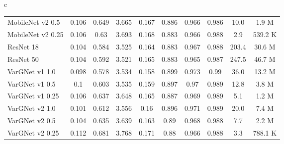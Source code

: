 \documentclass{article}
\begin{document}
\begin{table}
{\begin{tabular}{c}
\begin{tabular}{lccccccccc}
      MobileNet v2 0.5 & 0.106 & 0.649 & 3.665 & 0.167 & 0.886 & 0.966 & 0.986 & 10.0 & 1.9 M \\
      MobileNet v2 0.25 & 0.106 & 0.63 & 3.693 & 0.168 & 0.883 & 0.966 & 0.988 & 2.9 & 539.2 K \\
ResNet 18 & 0.104 & 0.584 & 3.525 & 0.164 & 0.883 & 0.967 & 0.988 & 203.4    & 30.6 M \\
      ResNet 50 & 0.104 & 0.592 & 3.521 & 0.165 & 0.883 & 0.965 & 0.987 & 247.5    & 46.7 M \\ \midrule
      VarGNet v1 1.0 &  0.098 & 0.578 & 3.534 & 0.158 & 0.899 & 0.973 & 0.99 &  36.0   &13.2 M\\
      VarGNet v1 0.5 &  0.1 & 0.603 & 3.535 & 0.159 & 0.897 & 0.97 & 0.989 &  12.8   &3.8 M\\
      VarGNet v1 0.25 & 0.106 & 0.637 & 3.648 & 0.165 & 0.887 & 0.969 & 0.989 &  5.1 &1.2 M\\\midrule
      VarGNet v2 1.0 & 0.101 & 0.612 & 3.556 & 0.16 & 0.896 & 0.971 & 0.989 & 20.0& 7.4 M\\
      VarGNet v2 0.5 & 0.104 & 0.635 & 3.639 & 0.163 & 0.89 & 0.968 & 0.988 & 7.7& 2.2 M\\
      VarGNet v2 0.25 & 0.112 & 0.681 & 3.768 & 0.171 & 0.88 & 0.966 & 0.988 & 3.3& 788.1 K\\ \bottomrule
    \end{tabular}
  \end{tabular}
  }
\end{table}
\end{document}
